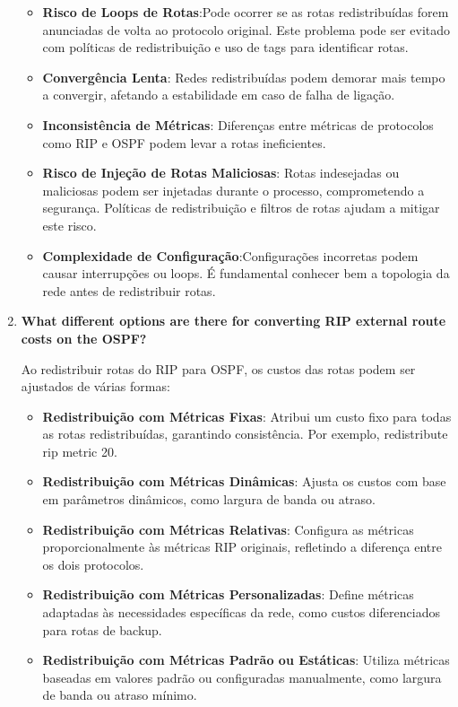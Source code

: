\documentclass[11pt,english, openright, oneside]{book}
\begin{document}
\begin{enumerate}
  \begin{itemize}
    \item \textbf{Risco de Loops de Rotas}:Pode ocorrer se as rotas redistribuídas forem anunciadas de volta ao protocolo original. Este problema pode ser evitado com políticas de redistribuição e uso de tags para identificar rotas.
    \item \textbf{Convergência Lenta}: Redes redistribuídas podem demorar mais tempo a convergir, afetando a estabilidade em caso de falha de ligação.
    \item \textbf{Inconsistência de Métricas}: Diferenças entre métricas de protocolos como RIP e OSPF podem levar a rotas ineficientes.
    \item \textbf{Risco de Injeção de Rotas Maliciosas}: Rotas indesejadas ou maliciosas podem ser injetadas durante o processo, comprometendo a segurança. Políticas de redistribuição e filtros de rotas ajudam a mitigar este risco.
    \item \textbf{Complexidade de Configuração}:Configurações incorretas podem causar interrupções ou loops. É fundamental conhecer bem a topologia da rede antes de redistribuir rotas.
  \end{itemize}
  \vspace{0.2cm}

  \newpage
  \item \textbf{What different options are there for converting RIP external route costs on the OSPF?}
  \vspace{0.2cm}

  \par Ao redistribuir rotas do RIP para OSPF, os custos das rotas podem ser ajustados de várias formas:
  \vspace{0.2cm}

  \begin{itemize}
    \item \textbf{Redistribuição com Métricas Fixas}: Atribui um custo fixo para todas as rotas redistribuídas, garantindo consistência. Por exemplo, redistribute rip metric 20.
    \item \textbf{Redistribuição com Métricas Dinâmicas}: Ajusta os custos com base em parâmetros dinâmicos, como largura de banda ou atraso.
    \item \textbf{Redistribuição com Métricas Relativas}: Configura as métricas proporcionalmente às métricas RIP originais, refletindo a diferença entre os dois protocolos.
    \item \textbf{Redistribuição com Métricas Personalizadas}: Define métricas adaptadas às necessidades específicas da rede, como custos diferenciados para rotas de backup.
    \item \textbf{Redistribuição com Métricas Padrão ou Estáticas}: Utiliza métricas baseadas em valores padrão ou configuradas manualmente, como largura de banda ou atraso mínimo.
  \end{itemize}
  \vspace{0.2cm}
  \end{enumerate}
\end{document}
